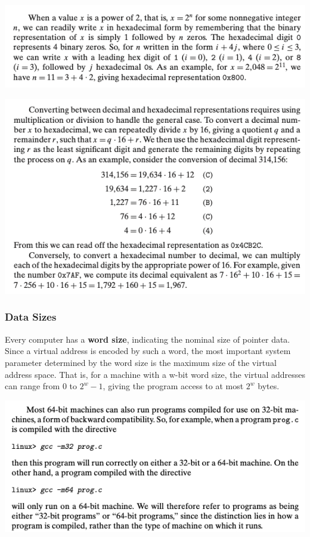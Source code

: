 \documentclass[11pt]{article}
\begin{document}
\begin{center}
\includegraphics[width=.9\linewidth]{pics/x-equals-n-exponentinal.png}
\end{center}

\begin{center}
\includegraphics[width=.9\linewidth]{pics/converting-between-decimal-and-hexidecimal.png}
\end{center}

\subsubsection{Data Sizes}
\label{sec:org66e05b9}
Every computer has a \textbf{word size}, indicating the nominal size of pointer data. Since a virtual address is encoded by such a word, the most important system parameter determined by the word size is the maximum size of the virtual address space. That is, for a machine with a w-bit word size, the virtual addresses can range from 0 to \(2^w − 1\), giving the program access to at most \(2^w\) bytes.\\

\begin{center}
\includegraphics[width=.9\linewidth]{pics/32-vs-64.png}
\end{center}
\end{document}
